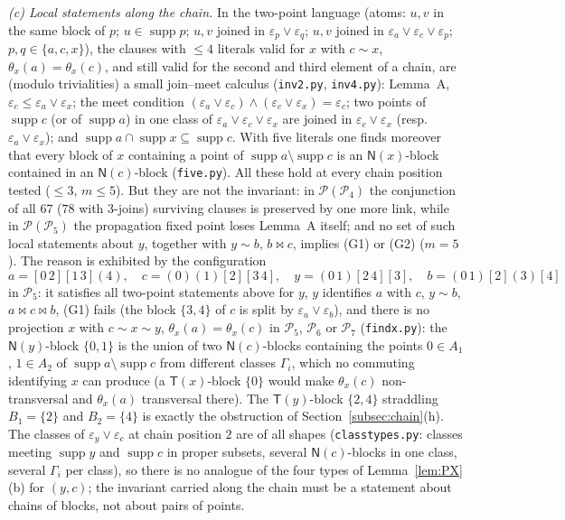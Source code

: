 \documentclass[11pt]{amsart}
\theoremstyle{definition}
\renewcommand{\P}{\mathcal{P}}
\newcommand{\supp}{\operatorname{supp}}
\newcommand{\T}{\mathsf{T}}
\newcommand{\N}{\mathsf{N}}
\newcommand{\mt}{\bowtie}   %
\begin{document}
\emph{(c) Local statements along the chain.} In the two-point language (atoms: $u,v$ in the same block of $p$; $u\in\supp p$; $u,v$ joined in $\varepsilon_p\vee\varepsilon_q$; $u,v$ joined in $\varepsilon_a\vee\varepsilon_c\vee\varepsilon_p$; $p,q\in\{a,c,x\}$), the clauses with $\le4$ literals valid for $x$ with $c\sim x$, $\theta_x(a)=\theta_x(c)$, and still valid for the second and third element of a chain, are (modulo trivialities) a small join--meet calculus (\texttt{inv2.py}, \texttt{inv4.py}): Lemma~A, $\varepsilon_c\le\varepsilon_a\vee\varepsilon_x$; the meet condition $(\varepsilon_a\vee\varepsilon_c)\wedge(\varepsilon_c\vee\varepsilon_x)=\varepsilon_c$; two points of $\supp c$ (or of $\supp a$) in one class of $\varepsilon_a\vee\varepsilon_c\vee\varepsilon_x$ are joined in $\varepsilon_c\vee\varepsilon_x$ (resp.\ $\varepsilon_a\vee\varepsilon_x$); and $\supp a\cap\supp x\subseteq\supp c$. With five literals one finds moreover that every block of $x$ containing a point of $\supp a\setminus\supp c$ is an $\N(x)$-block contained in an $\N(c)$-block (\texttt{five.py}). All these hold at every chain position tested ($\le3$, $m\le5$). But they are not the invariant: in $\P(\P_4)$ the conjunction of all $67$ ($78$ with 3-joins) surviving clauses is preserved by one more link, while in $\P(\P_5)$ the propagation fixed point loses Lemma~A itself; and no set of such local statements about $y$, together with $y\sim b$, $b\mt c$, implies (G1) or (G2) ($m=5$). The reason is exhibited by the configuration
\[
a=[0\,2][1\,3](4),\quad c=(0)(1)[2][3\,4],\quad y=(0\,1)[2\,4][3],\quad b=(0\,1)[2](3)[4]
\]
in $\P_5$: it satisfies all two-point statements above for $y$, $y$ identifies $a$ with $c$, $y\sim b$, $a\mt c\mt b$, (G1) fails (the block $\{3,4\}$ of $c$ is split by $\varepsilon_a\vee\varepsilon_b$), and there is no projection $x$ with $c\sim x\sim y$, $\theta_x(a)=\theta_x(c)$ in $\P_5$, $\P_6$ or $\P_7$ (\texttt{findx.py}): the $\N(y)$-block $\{0,1\}$ is the union of two $\N(c)$-blocks containing the points $0\in A_1$, $1\in A_2$ of $\supp a\setminus\supp c$ from different classes $\Gamma_i$, which no commuting identifying $x$ can produce (a $\T(x)$-block $\{0\}$ would make $\theta_x(c)$ non-transversal and $\theta_x(a)$ transversal there). The $\T(y)$-block $\{2,4\}$ straddling $B_1=\{2\}$ and $B_2=\{4\}$ is exactly the obstruction of Section~\ref{subsec:chain}(h). The classes of $\varepsilon_y\vee\varepsilon_c$ at chain position $2$ are of all shapes (\texttt{classtypes.py}: classes meeting $\supp y$ and $\supp c$ in proper subsets, several $\N(c)$-blocks in one class, several $\Gamma_i$ per class), so there is no analogue of the four types of Lemma~\ref{lem:PX}(b) for $(y,c)$; the invariant carried along the chain must be a statement about chains of blocks, not about pairs of points.
\end{document}
